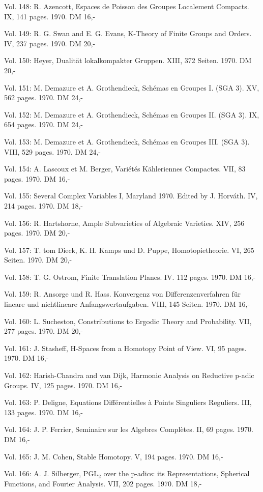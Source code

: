 Vol. 148: R. Azencott, Espaces de Poisson des Groupes Localement Compacts. IX, 141 pages. 1970. DM 16,-

Vol. 149: R. G. Swan and E. G. Evans, K-Theory of Finite Groups and Orders. IV, 237 pages. 1970. DM 20,-

Vol. 150: Heyer, Dualität lokalkompakter Gruppen. XIII, 372 Seiten. 1970. DM 20,-

Vol. 151: M. Demazure et A. Grothendieck, Schémas en Groupes I. (SGA 3). XV, 562 pages. 1970. DM 24,-

Vol. 152: M. Demazure et A. Grothendieck, Schémas en Groupes II. (SGA 3). IX, 654 pages. 1970. DM 24,-

Vol. 153: M. Demazure et A. Grothendieck, Schémas en Groupes III. (SGA 3). VIII, 529 pages. 1970. DM 24,-

Vol. 154: A. Lascoux et M. Berger, Variétés Kähleriennes Compactes. VII, 83 pages. 1970. DM 16,-

Vol. 155: Several Complex Variables I, Maryland 1970. Edited by J. Horváth. IV, 214 pages. 1970. DM 18,-

Vol. 156: R. Hartshorne, Ample Subvarieties of Algebraic Varieties. XIV, 256 pages. 1970. DM 20,-

Vol. 157: T. tom Dieck, K. H. Kamps und D. Puppe, Homotopietheorie. VI, 265 Seiten. 1970. DM 20,-

Vol. 158: T. G. Ostrom, Finite Translation Planes. IV. 112 pages. 1970. DM 16,-

Vol. 159: R. Ansorge und R. Hass. Konvergenz von Differenzenverfahren für lineare und nichtlineare Anfangswertaufgaben. VIII, 145 Seiten. 1970. DM 16,-

Vol. 160: L. Sucheston, Constributions to Ergodic Theory and Probability. VII, 277 pages. 1970. DM 20,-

Vol. 161: J. Stasheff, H-Spaces from a Homotopy Point of View. VI, 95 pages. 1970. DM 16,-

Vol. 162: Harish-Chandra and van Dijk, Harmonic Analysis on Reductive p-adic Groups. IV, 125 pages. 1970. DM 16,-

Vol. 163: P. Deligne, Equations Différentielles à Points Singuliers Reguliers. III, 133 pages. 1970. DM 16,-

Vol. 164: J. P. Ferrier, Seminaire sur les Algebres Complètes. II, 69 pages. 1970. DM 16,-

Vol. 165: J. M. Cohen, Stable Homotopy. V, 194 pages. 1970. DM 16,-

Vol. 166: A. J. Silberger, PGL$_2$ over the p-adics: its Representations, Spherical Functions, and Fourier Analysis. VII, 202 pages. 1970. DM 18,-


